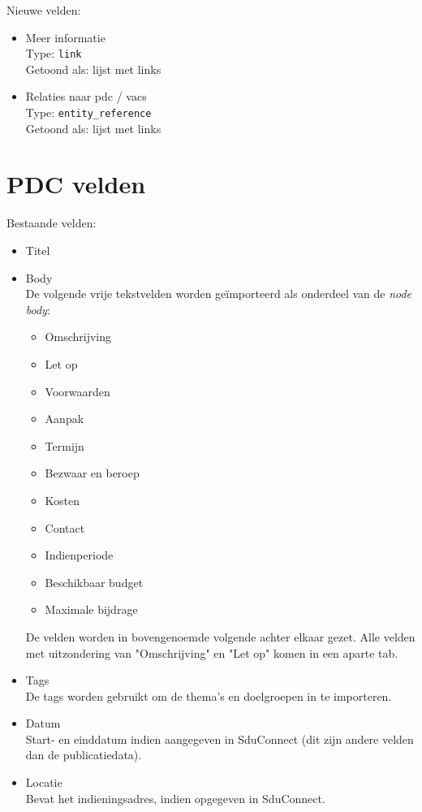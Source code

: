 \documentclass[12pt]{article}
\begin{document}
Nieuwe velden:
\begin{itemize}
\item Meer informatie \\
Type: \texttt{link} \\
Getoond als: lijst met links
\item Relaties naar pdc / vacs \\
Type: \texttt{entity\_reference} \\
Getoond als: lijst met links
\end{itemize}

\clearpage
\section{PDC velden}
Bestaande velden:
\begin{itemize}
\item Titel
\item Body \\
De volgende vrije tekstvelden worden ge\"{i}mporteerd als onderdeel van de \emph{node body}:
\begin{itemize}
\item Omschrijving
\item Let op
\item Voorwaarden
\item Aanpak
\item Termijn
\item Bezwaar en beroep
\item Kosten
\item Contact
\item Indienperiode
\item Beschikbaar budget
\item Maximale bijdrage
\end{itemize}
De velden worden in bovengenoemde volgende achter elkaar gezet. Alle velden met uitzondering van "Omschrijving" en "Let op" komen in een aparte tab.
\item Tags \\
De tags worden gebruikt om de thema's en doelgroepen in te importeren.
\item Datum \\
Start- en einddatum indien aangegeven in SduConnect (dit zijn andere velden dan de publicatiedata).
\item Locatie \\
Bevat het indieningsadres, indien opgegeven in SduConnect.
\end{itemize}
\end{document}
